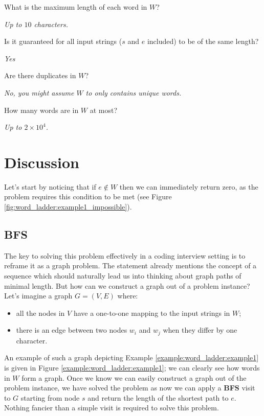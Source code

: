 \begin{QandA}
    \item What is the maximum length of each word in $W$?
    \begin{answered}
        \textit{Up to $10$ characters.}
    \end{answered}
    
    \item Is it guaranteed for all input strings ($s$ and $e$ included) to be of the same length?
    \begin{answered}
        \textit{Yes}
    \end{answered}

    \item Are there duplicates in $W$?
    \begin{answered}
        \textit{No, you might assume $W$ to only contains unique words.}
    \end{answered}

    \item How many words are in $W$ at most?
    \begin{answered}
        \textit{Up to $2\times 10^4$.}
    \end{answered}

\end{QandA}

\section{Discussion}
\label{word_ladder:sec:discussion}
Let's start by noticing that if $e \notin W$ then we can immediately return zero, as the problem requires this condition to be met (see Figure \ref{fig:word_ladder:example1_impossible}).


\subsection{BFS}
\label{word_ladder:sec:bruteforce}
The key to solving this problem effectively in a coding interview setting is to reframe it as a graph problem. 
The statement already mentions the concept of a sequence which should naturally lead us into thinking about graph paths of minimal length.
But how can we construct a graph out of a problem instance?
Let's imagine a graph $G=(V,E)$ where:
\begin{itemize}
    \item all the nodes in $V$ have a one-to-one mapping to the input strings in $W$;
    \item there is an edge between two nodes $w_i$ and $w_j$ when they differ by one character.
\end{itemize}
An example of such a graph depicting Example \ref{example:word_ladder:example1} is given in Figure \ref{example:word_ladder:example1}; we can clearly see how words in $W$ form a graph.
Once we know we can easily construct a graph out of the problem instance, we have solved the problem as now we can apply a \textbf{BFS} visit to $G$ starting from node $s$ and return the length of the shortest path to $e$.
Nothing fancier than a simple visit is required to solve this problem.

